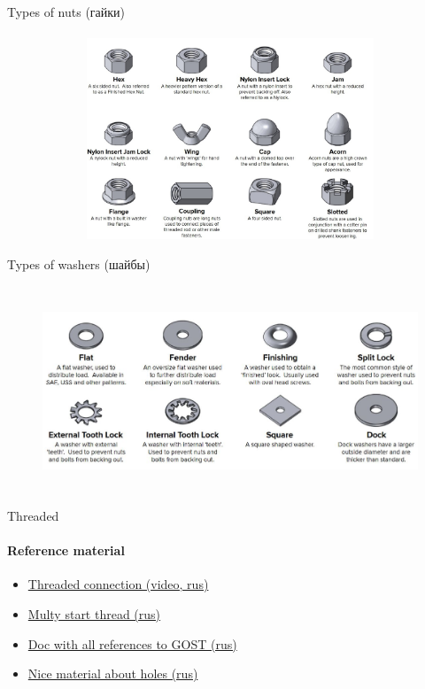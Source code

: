 \documentclass[aspectratio=169]{beamer}
\begin{document}
\begin{frame}[t]{Types of nuts (гайки)}
    \framesubtitle{}
    \vspace{-0.6cm}
    \begin{figure}[H]
        \centering\includegraphics[height=6cm,width=1\textwidth,keepaspectratio]{nuts.jpg}
        \label{fig:nuts.jpg}
    \end{figure}
\end{frame}

\begin{frame}[t]{Types of washers (шайбы)}
    \framesubtitle{}
    \vspace{-0.6cm}
    \begin{figure}[H]
        \centering\includegraphics[height=6cm,width=1\textwidth,keepaspectratio]{washers.jpg}
        \label{fig:washers.jpg}
    \end{figure}
\end{frame}

\begin{frame}[t]{Threaded}
    \framesubtitle{Reference material}
    \begin{itemize}
        \item \href{https://youtu.be/LYUKs4LePc4}{Threaded connection (video, rus)}
        \item \href{https://steepmen.ru/mnogozakhodnaya-rezba/}{Multy start thread (rus)}
        \item \href{http://ng.sibstrin.ru/wolchin/umm/carving/carving/003.htm\#001}{Doc with all references to GOST (rus)}
        \item \href{https://cadinstructor.org/eg/lectures/5-2-krepegnie-izdeliya/\#5.515}{Nice material about holes (rus)}
    \end{itemize}
\end{frame}
\end{document}
